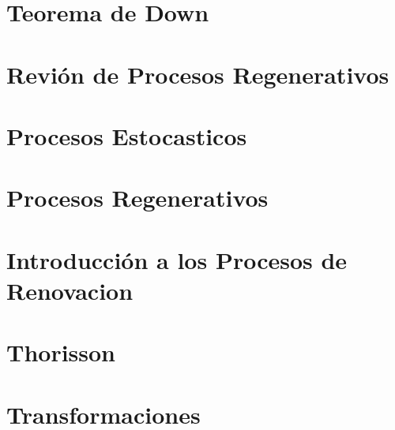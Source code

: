 \documentclass{report}
\begin{document}
%

%

%

\chapter{Teorema de Down}



\chapter{Revi\'on de Procesos Regenerativos}



\chapter{Procesos Estocasticos}


\chapter{Procesos Regenerativos}


\chapter{Introducción a los Procesos de Renovacion}



\chapter{Thorisson}




\chapter{Transformaciones}
%
\end{document}
